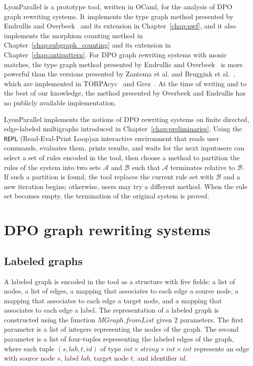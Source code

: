 LyonParallel is a prototype tool, written in OCaml, for the analysis of DPO graph rewriting systems.
It implements the type graph method presented by Endrullis and Overbeek~\cite{endrullis2024generalized_icgt} and its extension in Chapter~\ref{chap:nwf}, and it also implements the morphism counting method in Chapter~\ref{chap:subgraph_counting} and its extension in Chapter~\ref{chap:antipattern}. 
For DPO graph rewriting systems with monic matches,
the type graph method presented by Endrullis and Overbeek~\cite{endrullis2024generalized_icgt} is more powerful than the versions presented by Zantema et al. and Bruggink et al.~\cite{zantema2014termination,bruggink2014termination,bruggink2015proving}, which are implemented in TORPAcyc~\cite{TORPAcyc} and Grez~\cite{grez}. At the time of writing and to the best of our knowledge, the method presented by Overbeek and Endrullis has no publicly available implementation.

LyonParallel implements the notions of DPO rewriting systems on finite directed, edge-labeled multigraphs introduced in Chapter~\ref{chap:preliminaries}. Using the \texttt{REPL} (Read-Eval-Print Loop)\textemdash{}an interactive environment that reads user commands, evaluates them, prints results, and waits for the next input\textemdash{}users can select a set of rules encoded in the tool, then choose a method to partition the rules of the system into two sets $\mathcal{A}$ and $\mathcal{B}$ such that $\mathcal{A}$ terminates relative to $\mathcal{B}$. If such a partition is found, the tool replaces the current rule set with \(\mathcal{B}\) and a new iteration begins; otherwise, users may try a different method. When the rule set becomes empty, the termination of the original system is proved.
\section{DPO graph rewriting systems}
\label{lyonparallel:sec:implementation_of_dpo_graph_rewriting_systems}
\subsection{Labeled graphs}
\label{lyonparallel:sec:labeled_graphs}
A labeled graph is encoded in the tool as a structure with five fields: a list of nodes, a list of edges, a mapping that associates to each edge a source node, a mapping that associates to each edge a target node, and a mapping that associates to each edge a label.
The representation of a labeled graph is constructed using the function \colorbox{Ivory2}{$MGraph.fromList$} given 2 parameters. The first parameter is a list of integers representing the nodes of the graph. The second parameter is a list of four-tuples representing the labeled edges of the graph, where each tuple \colorbox{Ivory2}{$(s,lab,t,id)$} of type \colorbox{Ivory2}{$\textit{int}\times \textit{string}\times \textit{int}\times \textit{int}$} represents an edge with source node $s$, label $lab$, target node $t$, and identifier $id$.

